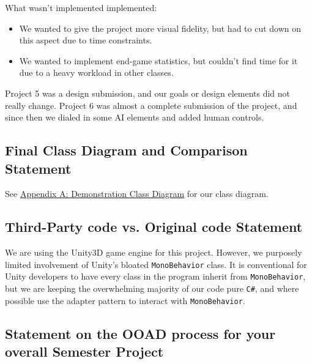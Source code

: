 \documentclass[11pt]{amsart}
\begin{document}
What wasn't implemented implemented:
\begin{itemize}
    \item We wanted to give the project more visual fidelity, but had to cut down on this aspect due to time constraints.
    \item We wanted to implement end-game statistics, but couldn't find time for it due to a heavy workload in other classes.
\end{itemize}

Project 5 was a design submission, and our goals or design elements did not really change. Project 6 was almost a complete submission of the project, and since then we dialed in some AI elements and added human controls.

\newpage
\subsection*{Final Class Diagram and Comparison Statement} \phantom{}





See \hyperref[sec:appendixa]{Appendix A: Demonstration Class Diagram} for our class diagram.

\subsection*{Third-Party code vs. Original code Statement} \phantom{}

We are using the Unity3D game engine for this project. However, we purposely limited involvement of Unity's bloated \texttt{MonoBehavior} class. It is conventional for Unity developers to have every class in the program inherit from \texttt{MonoBehavior}, but we are keeping the overwhelming majority of our code pure \texttt{C\#}, and where possible use the adapter pattern to interact with \texttt{MonoBehavior}. 

\subsection*{Statement on the OOAD process for your overall Semester Project} \phantom{}
\end{document}
